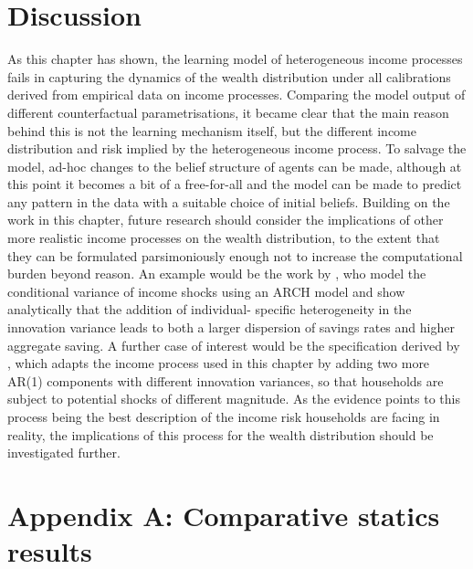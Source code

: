 \section{Discussion}\label{sec:discussion}
As this chapter has shown, the learning model of heterogeneous income processes
fails in capturing the dynamics of the wealth distribution under all calibrations
derived from empirical data on income processes. Comparing the model output of 
different counterfactual parametrisations, it became clear that the main reason
behind this is not the learning mechanism itself, but the different income 
distribution and risk implied by the heterogeneous income process. To salvage 
the model, ad-hoc changes to the belief structure of agents can be made, although
at this point it becomes a bit of a free-for-all and the model can be made to
predict any pattern in the data with a suitable choice of initial beliefs.
Building on the work in this chapter, future research should consider the implications
of other more realistic income processes on the wealth distribution, to the 
extent that they can be formulated parsimoniously enough not to increase the 
computational burden beyond reason. An example would be the work by 
\citet{MeghirPistaferri2004}, who model the conditional variance of income
shocks using an ARCH model and show analytically that the addition of individual-
specific heterogeneity in the innovation variance leads to both a larger dispersion
of savings rates and higher aggregate saving. A further case of interest would be
the specification derived by \citet{GKOS2015}, which adapts the income process
used in this chapter by adding two more AR(1) components with different innovation
variances, so that households are subject to potential shocks of different 
magnitude. As the evidence points to this process being the best description 
of the income risk households are facing in reality, the implications of this
process for the wealth distribution should be investigated further. 

\section{Appendix A: Comparative statics results}

